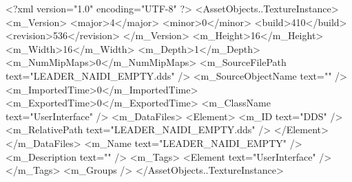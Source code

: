 <?xml version="1.0" encoding="UTF-8" ?>
<AssetObjects..TextureInstance>
	<m_Version>
		<major>4</major>
		<minor>0</minor>
		<build>410</build>
		<revision>536</revision>
	</m_Version>
	<m_Height>16</m_Height>
	<m_Width>16</m_Width>
	<m_Depth>1</m_Depth>
	<m_NumMipMaps>0</m_NumMipMaps>
	<m_SourceFilePath text="LEADER_NAIDI_EMPTY.dds" />
	<m_SourceObjectName text="" />
	<m_ImportedTime>0</m_ImportedTime>
	<m_ExportedTime>0</m_ExportedTime>
	<m_ClassName text="UserInterface" />
	<m_DataFiles>
		<Element>
			<m_ID text="DDS" />
			<m_RelativePath text="LEADER_NAIDI_EMPTY.dds" />
		</Element>
	</m_DataFiles>
	<m_Name text="LEADER_NAIDI_EMPTY" />
	<m_Description text="" />
	<m_Tags>
		<Element text="UserInterface" />
	</m_Tags>
	<m_Groups />
</AssetObjects..TextureInstance>
